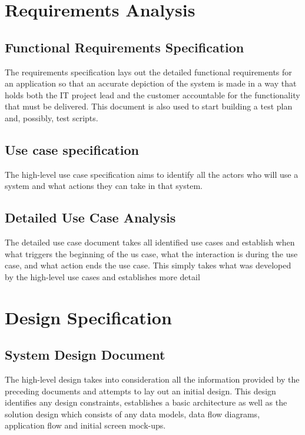\documentclass[a4paper,12pt]{article}
\begin{document}
\section {Requirements Analysis}

\subsection {Functional Requirements Specification}

The requirements specification lays out the detailed functional requirements for an application so that an
accurate depiction of the system is made in a way that holds both the IT project lead and the customer accountable for the functionality that must be delivered.  This document is also used to start building a test plan and, possibly, test scripts.

\subsection {Use case specification}
The high-level use case specification aims to identify all the actors who will use a system and what
actions they can take in that system.

\subsection {Detailed Use Case Analysis}
The detailed use case document takes all identified use cases and establish when what triggers the
beginning of the us case, what the interaction is during the use case, and what action ends the use case.  This simply takes what
was developed by the high-level use cases and establishes more detail

\section {Design Specification}
\subsection {System Design Document}

The high-level design takes into consideration all the information provided by the preceding documents
and attempts to lay out an initial design.  This design identifies any design constraints, establishes a basic architecture as well as
the solution design which consists of any data models, data flow diagrams, application flow and initial screen mock-ups.
\end{document}
